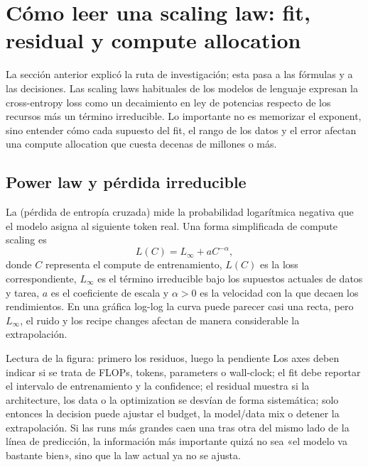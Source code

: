 \section{Cómo leer una scaling law: fit, residual y compute allocation}

La sección anterior explicó la ruta de investigación; esta pasa a las fórmulas y a las decisiones. Las scaling laws habituales de los modelos de lenguaje expresan la cross-entropy loss como un decaimiento en ley de potencias respecto de los recursos más un término irreducible. Lo importante no es memorizar el exponent, sino entender cómo cada supuesto del fit, el rango de los datos y el error afectan una compute allocation que cuesta decenas de millones o más.

\subsection{Power law y pérdida irreducible}

La  (pérdida de entropía cruzada) mide la probabilidad logarítmica negativa que el modelo asigna al siguiente token real. Una forma simplificada de compute scaling es
\[
L(C)=L_{\infty}+aC^{-\alpha},
\]
donde $C$ representa el compute de entrenamiento, $L(C)$ es la loss correspondiente, $L_{\infty}$ es el término irreducible bajo los supuestos actuales de datos y tarea, $a$ es el coeficiente de escala y $\alpha>0$ es la velocidad con la que decaen los rendimientos. En una gráfica log-log la curva puede parecer casi una recta, pero $L_{\infty}$, el ruido y los recipe changes afectan de manera considerable la extrapolación.


\begin{knowledgebox}{Lectura de la figura: primero los residuos, luego la pendiente}
Los axes deben indicar si se trata de FLOPs, tokens, parameters o wall-clock; el fit debe reportar el intervalo de entrenamiento y la confidence; el residual muestra si la architecture, los data o la optimization se desvían de forma sistemática; solo entonces la decision puede ajustar el budget, la model/data mix o detener la extrapolación. Si las runs más grandes caen una tras otra del mismo lado de la línea de predicción, la información más importante quizá no sea «el modelo va bastante bien», sino que la law actual ya no se ajusta.
\end{knowledgebox}

